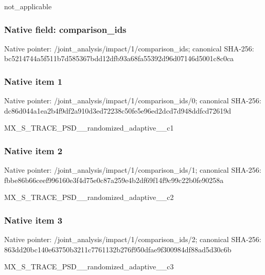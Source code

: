 \documentclass[10pt,a4paper]{article}
\begin{document}
\begingroup\raggedright\sloppy not\_\allowbreak{}applicable\par\endgroup

\subsubsection{Native field: comparison\_\allowbreak{}ids}
Native pointer: /joint\_\allowbreak{}analysis/impact/1/comparison\_\allowbreak{}ids; canonical SHA-256: bc5214744a5f511b7d585367bdd12dfb93a68fa55392d96d07146d5001c8c0ca

\subsubsection{Native item 1}
Native pointer: /joint\_\allowbreak{}analysis/impact/1/comparison\_\allowbreak{}ids/0; canonical SHA-256: dc86d044a1ea2b4f9df2a910d3ed72238c50fe5e96ed2dcd7d948ddfcd72619d

\begingroup\raggedright\sloppy MX\_\allowbreak{}S\_\allowbreak{}TRACE\_\allowbreak{}PSD\_\allowbreak{}\_\allowbreak{}randomized\_\allowbreak{}adaptive\_\allowbreak{}\_\allowbreak{}c1\par\endgroup

\subsubsection{Native item 2}
Native pointer: /joint\_\allowbreak{}analysis/impact/1/comparison\_\allowbreak{}ids/1; canonical SHA-256: fbbe86b66ceef996160e3f4d75e0c87a259e4b2df69f14f9c99c22b0fe90258a

\begingroup\raggedright\sloppy MX\_\allowbreak{}S\_\allowbreak{}TRACE\_\allowbreak{}PSD\_\allowbreak{}\_\allowbreak{}randomized\_\allowbreak{}adaptive\_\allowbreak{}\_\allowbreak{}c2\par\endgroup

\subsubsection{Native item 3}
Native pointer: /joint\_\allowbreak{}analysis/impact/1/comparison\_\allowbreak{}ids/2; canonical SHA-256: 863dd20bc140e63750b3211c7761132b276f950dfae9f300984df88ad5d30c6b

\begingroup\raggedright\sloppy MX\_\allowbreak{}S\_\allowbreak{}TRACE\_\allowbreak{}PSD\_\allowbreak{}\_\allowbreak{}randomized\_\allowbreak{}adaptive\_\allowbreak{}\_\allowbreak{}c3\par\endgroup
\end{document}
